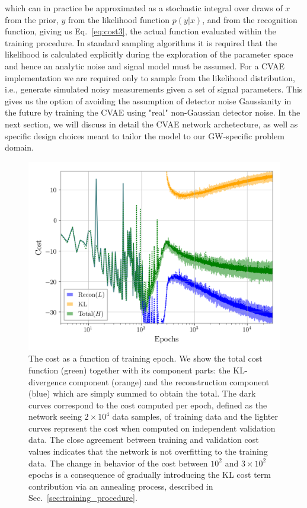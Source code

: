 %
which can in practice be approximated as a stochastic integral over draws of $x$ from the prior, $y$ from the likelihood function $p(y|x)$, and from the recognition function, giving us Eq.~\ref{eq:cost3}, the actual function evaluated within the training procedure. In standard sampling algorithms it is required that the likelihood is calculated explicitly during the exploration of the parameter space and hence an analytic noise and signal model must be assumed. For a \ac{CVAE} implementation we are required only to sample from the likelihood distribution, i.e., generate simulated noisy measurements given a set of signal parameters. This gives us the option of avoiding the assumption of detector noise Gaussianity in the future by training the \ac{CVAE} using "real" non-Gaussian detector noise.
In the next section, we will discuss in detail the \ac{CVAE} network 
archetecture, as well as specific design choices meant to tailor the 
model to our \ac{GW}-specific problem domain.

%
%
\begin{figure}
    \includegraphics[width=\columnwidth]{inv_losses_log.png}
\caption{\label{fig:loss_log} The cost as a function of training epoch. 
We show the total cost function (green) together with its component parts: 
the \ac{KL}-divergence component (orange) and the reconstruction 
component (blue) which are simply summed to obtain the total. 
The dark curves correspond to the cost computed per epoch, 
defined as the network seeing $2\times10^{4}$ data samples, 
of training data and the lighter curves
represent the cost when computed on independent validation data. 
The close agreement between training and validation cost values 
indicates that the network is not overfitting to the training data. 
The change in behavior of the cost between $10^2$ and $3\times10^2$ 
epochs is a consequence of gradually introducing the \ac{KL} 
cost term contribution via an annealing process, described in 
Sec.~\ref{sec:training_procedure}.} 
\end{figure}



